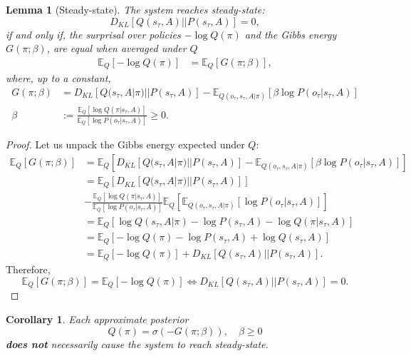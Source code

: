 \documentclass{article}
\newtheorem{lemma}[theorem]{Lemma}
\newtheorem{corollary}[theorem]{Corollary}
\begin{document}
\begin{lemma}[Steady-state]
\label{lemma:steady-state}
The system reaches steady-state: 
\begin{equation*}
    D_{KL}[Q(s_\tau, A) ||P(s_\tau, A)]=0,
\end{equation*}
 if and only if, the surprisal over policies $-\log Q(\pi)$ and the Gibbs energy $G(\pi; \beta)$, are equal when averaged under $Q$
\begin{align*}
    \mathbb E_Q[-\log Q(\pi)]&= \mathbb E_Q[G(\pi; \beta)],
\end{align*}
where, up to a constant,
\begin{align*}
    G(\pi; \beta) &= D_{KL}[Q(s_\tau, A|\pi)||P(s_\tau,A)]-\mathbb E_{Q(o_\tau, s_\tau, A|\pi)} [\beta \log P(o_\tau |s_\tau, A)] \\
    \beta &:= \frac{\mathbb E_Q[\log Q(\pi|s_\tau,A)]}{\mathbb E_Q[\log P(o_\tau|s_\tau,A)]} \geq 0.
\end{align*}
\end{lemma}

\begin{proof}
Let us unpack the Gibbs energy expected under $Q$:
\begin{equation*}
    \begin{split}
        \mathbb E_Q[G(\pi; \beta)] &=\mathbb E_Q[D_{KL}[Q(s_\tau, A|\pi)||P(s_\tau,A)]-\mathbb E_{Q(o_\tau, s_\tau, A|\pi)} [\beta \log P(o_\tau |s_\tau, A)]] \\
        &= \mathbb E_Q[D_{KL}[Q(s_\tau, A|\pi)||P(s_\tau,A)]]\\
        &-\frac{\mathbb E_Q[\log Q(\pi|s_\tau,A)]}{\mathbb E_Q[\log P(o_\tau|s_\tau,A)]} \mathbb E_Q [\mathbb E_{Q(o_\tau, s_\tau, A|\pi)} [ \log P(o_\tau |s_\tau, A)]] \\
        &= \mathbb E_Q[\log Q(s_\tau, A|\pi)-\log P(s_\tau, A)-\log Q(\pi |s_\tau,A)] \\
        &= \mathbb E_Q[-\log Q(\pi)-\log P(s_\tau, A)+\log Q(s_\tau,A)] \\
        &= \mathbb E_Q[-\log Q(\pi)] +D_{KL}[Q(s_\tau,A)||P(s_\tau, A)].
    \end{split}
\end{equation*}
Therefore,
\begin{equation*}
    \mathbb E_Q[G(\pi; \beta)] = \mathbb E_Q[-\log Q(\pi)] \iff D_{KL}[Q(s_\tau,A)||P(s_\tau, A)]=0.
\end{equation*}
\end{proof}

\begin{corollary}
Each approximate posterior
\begin{equation*}
    \label{eq:posterior_gibbs}
   Q(\pi) =\sigma(-G(\pi; \beta)),\quad \beta \geq 0
\end{equation*}
\textbf{does not} necessarily cause the system to reach steady-state.
\end{corollary}
\end{document}
